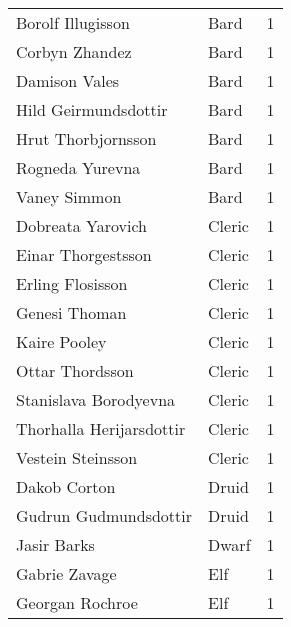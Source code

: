 \begin{tcolorbox}[breakable, title=Index by class]
\begin{supertabular}{p{0.6\columnwidth}lr}
Borolf Illugisson                                  & Bard            &     1\\
Corbyn Zhandez                                     & Bard            &     1\\
Damison Vales                                      & Bard            &     1\\
Hild Geirmundsdottir                               & Bard            &     1\\
Hrut Thorbjornsson                                 & Bard            &     1\\
Rogneda Yurevna                                    & Bard            &     1\\
Vaney Simmon                                       & Bard            &     1\\
Dobreata Yarovich                                  & Cleric          &     1\\
Einar Thorgestsson                                 & Cleric          &     1\\
Erling Flosisson                                   & Cleric          &     1\\
Genesi Thoman                                      & Cleric          &     1\\
Kaire Pooley                                       & Cleric          &     1\\
Ottar Thordsson                                    & Cleric          &     1\\
Stanislava Borodyevna                              & Cleric          &     1\\
Thorhalla Herijarsdottir                           & Cleric          &     1\\
Vestein Steinsson                                  & Cleric          &     1\\
Dakob Corton                                       & Druid           &     1\\
Gudrun Gudmundsdottir                              & Druid           &     1\\
Jasir Barks                                        & Dwarf           &     1\\
Gabrie Zavage                                      & Elf             &     1\\
Georgan Rochroe                                    & Elf             &     1\\

\end{supertabular}
\end{tcolorbox}
